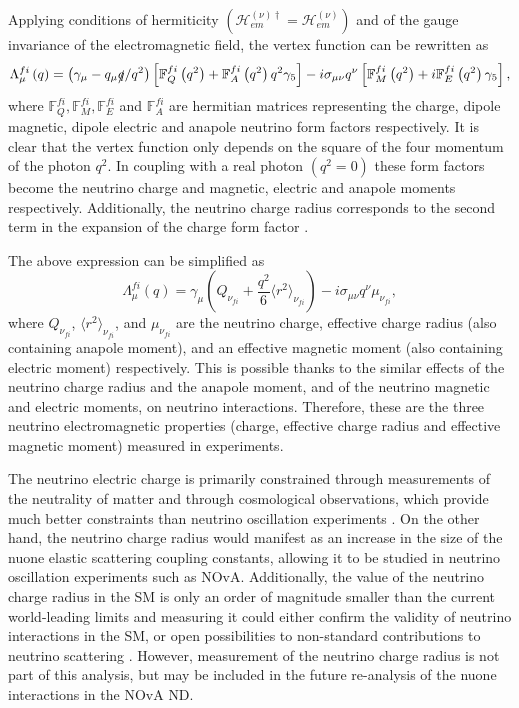 Applying conditions of hermiticity $\left(\mathcal{H}^{\left(\nu\right)\dagger}_{em}=\mathcal{H}^{\left(\nu\right)}_{em}\right)$ and of the gauge invariance of the electromagnetic field, the vertex function can be rewritten as
\begin{equation}
\Lambda^{fi}_{\mu}\left(q\right)=
\left(\gamma_{\mu}-q_{\mu}\slashed{q}/q^2\right)\left[
\mathbb{F}^{fi}_{Q}\left(q^2\right)+\mathbb{F}^{fi}_{A}\left(q^2\right)q^2\gamma_5\right]-
i\sigma_{\mu\nu}q^{\nu}\left[\mathbb{F}^{fi}_{M}\left(q^2\right)+i\mathbb{F}^{fi}_{E}\left(q^2\right)\gamma_5\right], 
\end{equation}
where $\mathbb{F}^{fi}_Q,\mathbb{F}^{fi}_M,\mathbb{F}^{fi}_E$ and $\mathbb{F}^{fi}_A$ are hermitian matrices representing the charge, dipole magnetic, dipole electric and anapole neutrino form factors respectively. It is clear that the vertex function only depends on the square of the four momentum of the photon $q^2$. In coupling with a real photon $\left(q^2=0\right)$ these form factors become the neutrino charge and magnetic, electric and anapole moments respectively. Additionally, the neutrino charge radius corresponds to the second term in the expansion of the charge form factor \cite{nuElmagInt2015.pdf}.

The above expression can be simplified \cite{NeutrinoPropertiesSnowmass2022.pdf} as
\begin{equation}
\Lambda^{fi}_{\mu}\left(q\right)=\gamma_{\mu}\left(Q_{\nu_{fi}}+\frac{q^2}{6}\langle r^2\rangle_{\nu_{fi}}\right)-i\sigma_{\mu\nu}q^{\nu}\mu_{\nu_{fi}},
\end{equation}
where $Q_{\nu_{fi}}$, $\langle r^2\rangle_{\nu_{fi}}$, and $\mu_{\nu_{fi}}$ are the neutrino charge, effective charge radius (also containing anapole moment), and an effective magnetic moment (also containing electric moment) respectively. This is possible thanks to the similar effects of the neutrino charge radius and the anapole moment, and of the neutrino magnetic and electric moments, on neutrino interactions. Therefore, these are the three neutrino electromagnetic properties (charge, effective charge radius and effective magnetic moment) measured in experiments.

The neutrino electric charge is primarily constrained through measurements of the neutrality of matter and through cosmological observations, which provide much better constraints than neutrino oscillation experiments \cite{nuElmagInt2015.pdf}. On the other hand, the neutrino charge radius would manifest as an increase in the size of the \gls{nuone} elastic scattering coupling constants, allowing it to be studied in neutrino oscillation experiments such as \gls{NOvA}. Additionally, the value of the neutrino charge radius in the \gls{SM} is only an order of magnitude smaller than the current world-leading limits \cite{PDG.pdf} and measuring it could either confirm the validity of neutrino interactions in the \gls{SM}, or open possibilities to non-standard contributions to neutrino scattering \cite{nuElmagInt2015.pdf}. However, measurement of the neutrino charge radius is not part of this analysis, but may be included in the future re-analysis of the \gls{nuone} interactions in the \gls{NOvA} \gls{ND}.


